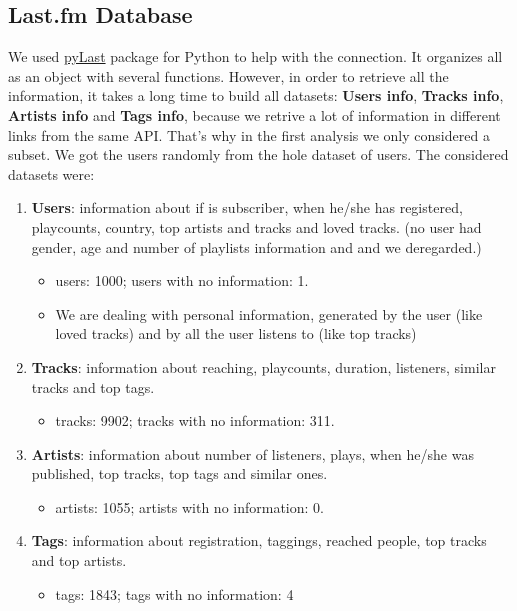 \documentclass{article}
\begin{document}
\subsection{Last.fm Database}

We used \href{https://github.com/pylast/pylast}{pyLast}
package for Python to help with the connection. It organizes all as an object
with several functions. However, in order to retrieve all the information, it
takes a long time to build all datasets: \textbf{Users info}, \textbf{Tracks
info}, \textbf{Artists info} and \textbf{Tags info}, because we retrive a lot
of information in different links from the same API. That's why in the first
analysis we only considered a subset. We got the users randomly from the hole
dataset of users. The considered datasets were: 

\begin{enumerate}
  \item \textbf{Users}: information about if is subscriber, when he/she 
  has registered, playcounts, country, top artists and tracks and loved
  tracks. (no user had gender, age and number of playlists information and and
  we deregarded.)
  \begin{itemize}
    \item users: 1000; users with no information: 1.
    \item We are dealing with personal information, generated by the user (like loved
    tracks) and by all the user listens to (like top tracks)    
  \end{itemize}
  \item \textbf{Tracks}: information about reaching, playcounts, duration,
  listeners, similar tracks and top tags.
  \begin{itemize}
    \item tracks: 9902; tracks with no information: 311.
  \end{itemize} 
  \item \textbf{Artists}: information about number of listeners, plays, when
  he/she was published, top tracks, top tags and similar ones.
  \begin{itemize}
    \item artists: 1055; artists with no information: 0.
  \end{itemize}
  \item \textbf{Tags}: information about registration, taggings, reached
  people, top tracks and top artists.
  \begin{itemize}
    \item tags: 1843; tags with no information: 4
  \end{itemize} 
\end{enumerate}
\end{document}
